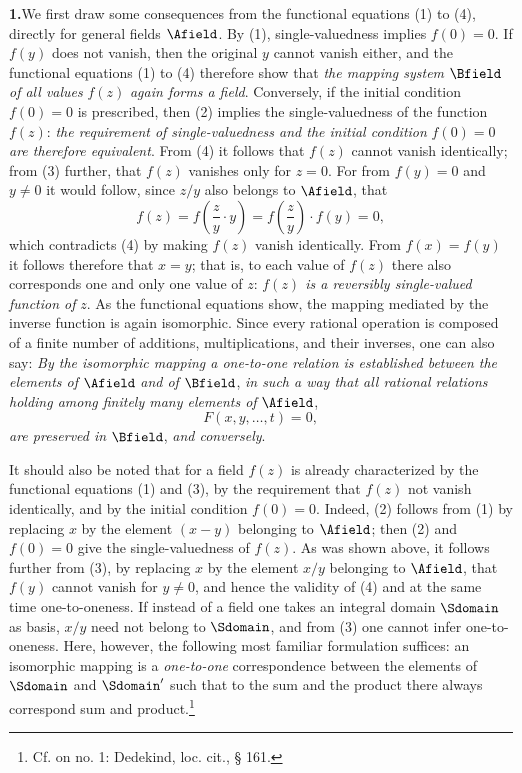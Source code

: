 \documentclass[11pt]{article}
\begin{document}
\medskip
\noindent\textbf{1.}\quad We first draw some consequences from the functional equations (1) to (4), directly for general fields \(\Afield\). By (1), single-valuedness implies \(f(0)=0\). If \(f(y)\) does not vanish, then the original \(y\) cannot vanish either, and the functional equations (1) to (4) therefore show that \emph{the mapping system} \(\Bfield\) \emph{of all values} \(f(z)\) \emph{again forms a field}. Conversely, if the initial condition \(f(0)=0\) is prescribed, then (2) implies the single-valuedness of the function \(f(z)\): \emph{the requirement of single-valuedness and the initial condition} \(f(0)=0\) \emph{are therefore equivalent}. From (4) it follows that \(f(z)\) cannot vanish identically; from (3) further, that \(f(z)\) vanishes only for \(z=0\). For from \(f(y)=0\) and \(y\ne0\) it would follow, since \(z/y\) also belongs to \(\Afield\), that
\[
f(z)=f\!\left(\frac{z}{y}\cdot y\right)=f\!\left(\frac{z}{y}\right)\cdot f(y)=0,
\]
which contradicts (4) by making \(f(z)\) vanish identically. From \(f(x)=f(y)\) it follows therefore that \(x=y\); that is, to each value of \(f(z)\) there also corresponds one and only one value of \(z\): \emph{\(f(z)\) is a reversibly single-valued function of} \(z\). As the functional equations show, the mapping mediated by the inverse function is again isomorphic. Since every rational operation is composed of a finite number of additions, multiplications, and their inverses, one can also say: \emph{By the isomorphic mapping a one-to-one relation is established between the elements of} \(\Afield\) \emph{and of} \(\Bfield\), \emph{in such a way that all rational relations holding among finitely many elements of} \(\Afield\),
\[
F(x,y,\ldots,t)=0,
\]
\emph{are preserved in} \(\Bfield\), \emph{and conversely}.

It should also be noted that for a field \(f(z)\) is already characterized by the functional equations (1) and (3), by the requirement that \(f(z)\) not vanish identically, and by the initial condition \(f(0)=0\). Indeed, (2) follows from (1) by replacing \(x\) by the element \((x-y)\) belonging to \(\Afield\); then (2) and \(f(0)=0\) give the single-valuedness of \(f(z)\). As was shown above, it follows further from (3), by replacing \(x\) by the element \(x/y\) belonging to \(\Afield\), that \(f(y)\) cannot vanish for \(y\ne0\), and hence the validity of (4) and at the same time one-to-oneness. If instead of a field one takes an integral domain \(\Sdomain\) as basis, \(x/y\) need not belong to \(\Sdomain\), and from (3) one cannot infer one-to-oneness. Here, however, the following most familiar formulation suffices: an isomorphic mapping is a \emph{one-to-one} correspondence between the elements of \(\Sdomain\) and \(\Sdomain'\) such that to the sum and the product there always correspond sum and product.\footnote{Cf. on no. 1: Dedekind, loc. cit., § 161.}
\end{document}
